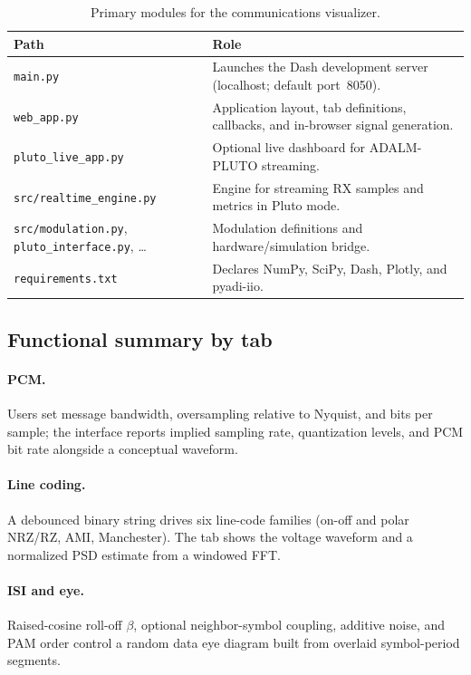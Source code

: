 \documentclass[11pt,a4paper]{article}
\begin{document}
\begin{table}[htbp]
    \centering
    \small
    \begin{tabularx}{\linewidth}{@{}lX@{}}
        \toprule
        \textbf{Path} & \textbf{Role} \\
        \midrule
        \texttt{main.py} & Launches the Dash development server (localhost; default port~8050). \\
        \texttt{web\_app.py} & Application layout, tab definitions, callbacks, and in-browser signal generation. \\
        \texttt{pluto\_live\_app.py} & Optional live dashboard for ADALM-PLUTO streaming. \\
        \texttt{src/realtime\_engine.py} & Engine for streaming RX samples and metrics in Pluto mode. \\
        \texttt{src/modulation.py}, \texttt{pluto\_interface.py}, \ldots & Modulation definitions and hardware/simulation bridge. \\
        \texttt{requirements.txt} & Declares NumPy, SciPy, Dash, Plotly, and pyadi-iio. \\
        \bottomrule
    \end{tabularx}
    \caption{Primary modules for the communications visualizer.}
    \label{tab:files}
\end{table}

\subsection{Functional summary by tab}
\paragraph{PCM.} Users set message bandwidth, oversampling relative to Nyquist, and bits per sample; the interface reports implied sampling rate, quantization levels, and PCM bit rate alongside a conceptual waveform.

\paragraph{Line coding.} A debounced binary string drives six line-code families (on-off and polar NRZ/RZ, AMI, Manchester). The tab shows the voltage waveform and a normalized PSD estimate from a windowed FFT.

\paragraph{ISI and eye.} Raised-cosine roll-off $\beta$, optional neighbor-symbol coupling, additive noise, and PAM order control a random data eye diagram built from overlaid symbol-period segments.
\end{document}
